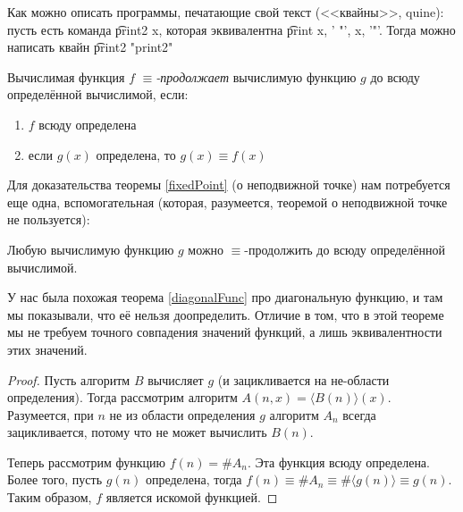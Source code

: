 \begin{Rem}
	Как можно описать программы, печатающие свой текст (<<квайны>>, quine): пусть есть команда \t{print2 x}, которая
	эквивалентна \t{print x, ' "', x, '"'}.
	Тогда можно написать квайн \t{print2 "print2"}
\end{Rem}

\begin{Def}
	Вычислимая функция $f$ \textit{$\equiv$-продолжает} вычислимую функцию $g$ до всюду определённой вычислимой, если:
	\begin{enumerate}
	\item $f$ всюду определена
	\item если $g(x)$ определена, то $g(x) \equiv f(x)$
	\end{enumerate}
\end{Def}


\label{fixedPointProof}
Для доказательства теоремы \ref{fixedPoint} (о неподвижной точке) нам потребуется еще одна, вспомогательная
(которая, разумеется, теоремой о неподвижной точке не пользуется):
\begin{theorem}\label{equivFuncExtend}
	Любую вычислимую функцию $g$ можно $\equiv$-продолжить до всюду определённой вычислимой.
\end{theorem}
\begin{Rem}
	У нас была похожая теорема \ref{diagonalFunc} про диагональную функцию, и там мы показывали, что её нельзя доопределить.
	Отличие в том, что в этой теореме мы не требуем точного совпадения значений функций, а лишь эквивалентности этих значений.
\end{Rem}
\begin{proof}
	Пусть алгоритм $B$ вычисляет $g$ (и зацикливается на не-области определения).
	Тогда рассмотрим алгоритм $A(n, x)=\langle B(n) \rangle(x)$.
	Разумеется, при $n$ не из области определения $g$ алгоритм $A_n$ всегда зацикливается, потому что не может вычислить $B(n)$.

	Теперь рассмотрим функцию $f(n) = \# A_n$.
	Эта функция всюду определена.
	Более того, пусть $g(n)$ определена, тогда $f(n) \equiv \# A_n \equiv \# \langle g(n) \rangle \equiv g(n)$.
	Таким образом, $f$ является искомой функцией.
\end{proof}

